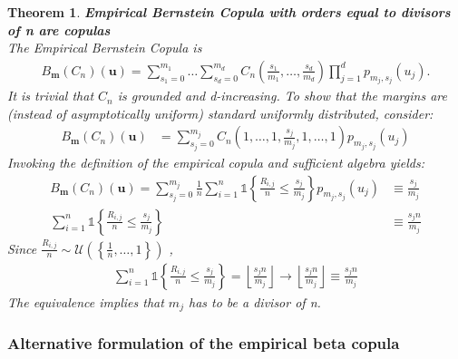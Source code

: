 \documentclass[12pt]{report}
\newtheorem{theorem}{Theorem}[subsection]
\newcommand{\1}{\mathbf{1}}
\begin{document}
\begin{theorem}\label{empiricalBersteinPolynomialCopula}
\textit{\normalfont\parencite{SegersEBC}}\:
\textbf{Empirical Bernstein Copula with orders equal to divisors of n are copulas} \\
The Empirical Bernstein Copula is
\begin{align*}
B_{\boldsymbol{m}}(C_{n})(\boldsymbol{u}) = \sum\limits_{s_{1} = 0}^{m_{1}} \dots \sum\limits_{s_{d} = 0}^{m_{d}} C_{n} \left(\frac{s_{1}}{m_{1}}, \dots, \frac{s_{d}}{m_{d}} \right) \prod\limits_{j = 1}^{d} p_{m_{j},s_{j}}(u_{j}).
\end{align*}
It is trivial that $C_{n}$ is grounded and d-increasing. To show that the margins are (instead of asymptotically uniform) standard uniformly distributed, consider:
\begin{align*}
B_{\boldsymbol{m}}(C_{n})(\boldsymbol{u}) &= \sum\limits_{s_{j} = 0}^{m_{j}} C_{n}(1, \dots, 1, \frac{s_{j}}{m_{j}}, 1, \dots, 1) p_{m_{j},s_{j}}(u_{j})
\end{align*}
Invoking the definition of the empirical copula and sufficient algebra yields:
\begin{align*}
B_{\boldsymbol{m}}(C_{n})(\boldsymbol{u}) = \sum\limits_{s_{j} = 0}^{m_{j}} \frac{1}{n} \sum\limits_{i = 1}^{n} \mathds{1} \left\{ \frac{R_{i,j}}{n} \le \frac{s_{j}}{m_{j}} \right\} p_{m_{j},s_{j}}(u_{j}) &\equiv \frac{s_{j}}{m_{j}} \\
\sum\limits_{i = 1}^{n} \mathds{1} \left\{ \frac{R_{i,j}}{n} \le \frac{s_{j}}{m_{j}} \right\} &\equiv \frac{s_{j}n}{m_{j}}
\end{align*}
Since $\frac{R_{i,j}}{n} \sim \mathcal{U}\left(\left\{\frac{1}{n}, \dots, 1 \right\}\right)$ , 
\begin{align*}
\sum\limits_{i = 1}^{n} \mathds{1} \left\{ \frac{R_{i,j}}{n} \le \frac{s_{j}}{m_{j}} \right\} = \left\lfloor \frac{s_{j}n}{m_{j}} \right\rfloor \rightarrow \left\lfloor \frac{s_{j}n}{m_{j}} \right\rfloor \equiv \frac{s_{j}n}{m_{j}}    
\end{align*}
The equivalence implies that $m_{j}$ has to be a divisor of n.
\end{theorem}

\newpage
\subsubsection{Alternative formulation of the empirical beta copula}
\end{document}

